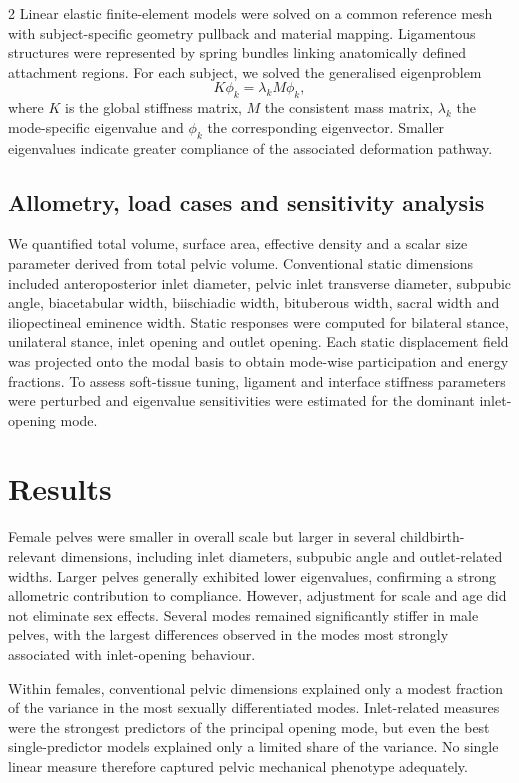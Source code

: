 \documentclass[openacc]{rsproca_new}
\begin{document}
\begin{multicols}{2}
Linear elastic finite-element models were solved on a common reference mesh with subject-specific geometry pullback and material mapping. Ligamentous structures were represented by spring bundles linking anatomically defined attachment regions. For each subject, we solved the generalised eigenproblem
\begin{equation}
K\phi_k = \lambda_k M\phi_k,
\end{equation}
where $K$ is the global stiffness matrix, $M$ the consistent mass matrix, $\lambda_k$ the mode-specific eigenvalue and $\phi_k$ the corresponding eigenvector. Smaller eigenvalues indicate greater compliance of the associated deformation pathway.

\subsection{Allometry, load cases and sensitivity analysis}

We quantified total volume, surface area, effective density and a scalar size parameter derived from total pelvic volume. Conventional static dimensions included anteroposterior inlet diameter, pelvic inlet transverse diameter, subpubic angle, biacetabular width, biischiadic width, bituberous width, sacral width and iliopectineal eminence width. Static responses were computed for bilateral stance, unilateral stance, inlet opening and outlet opening. Each static displacement field was projected onto the modal basis to obtain mode-wise participation and energy fractions. To assess soft-tissue tuning, ligament and interface stiffness parameters were perturbed and eigenvalue sensitivities were estimated for the dominant inlet-opening mode.

\section{Results}

Female pelves were smaller in overall scale but larger in several childbirth-relevant dimensions, including inlet diameters, subpubic angle and outlet-related widths. Larger pelves generally exhibited lower eigenvalues, confirming a strong allometric contribution to compliance. However, adjustment for scale and age did not eliminate sex effects. Several modes remained significantly stiffer in male pelves, with the largest differences observed in the modes most strongly associated with inlet-opening behaviour.

Within females, conventional pelvic dimensions explained only a modest fraction of the variance in the most sexually differentiated modes. Inlet-related measures were the strongest predictors of the principal opening mode, but even the best single-predictor models explained only a limited share of the variance. No single linear measure therefore captured pelvic mechanical phenotype adequately.


\end{multicols}
\end{document}
